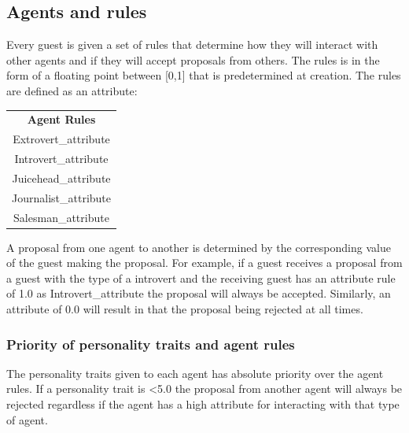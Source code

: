 \documentclass[a4paper,10pt]{article}
\begin{document}
\subsection{Agents and rules}
Every guest is given a set of rules that determine how they will interact with other agents and if they will accept proposals from others. The rules is in the form of a floating point between [0,1] that is predetermined at creation. The rules are defined as an attribute:

\begin{center}
\begin{tabular}{ |c| } 
 \hline
 \textbf{Agent Rules} \\
 Extrovert\_attribute \\
 Introvert\_attribute \\
 Juicehead\_attribute \\
 Journalist\_attribute \\
 Salesman\_attribute \\
 \hline
\end{tabular}
\end{center}

A proposal from one agent to another is determined by the corresponding value of the guest making the proposal. For example, if a guest receives a proposal from a guest with the type of a introvert and the receiving guest has an attribute rule of 1.0 as Introvert\_attribute the proposal will always be accepted. Similarly, an attribute of 0.0 will result in that the proposal being rejected at all times.

\subsubsection{Priority of personality traits and agent rules}
The personality traits given to each agent has absolute priority over the agent rules. If a personality trait is \textless 5.0 the proposal from another agent will always be rejected regardless if the agent has a high attribute for interacting with that type of agent. 
\end{document}
